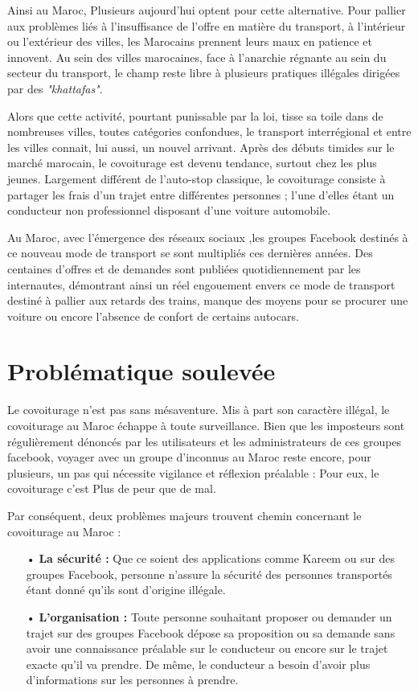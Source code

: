 \documentclass[a4paper]{report}
\begin{document}
\begin{spacing}{2}
Ainsi au Maroc, Plusieurs aujourd'hui optent pour cette alternative. Pour pallier aux problèmes liés à l’insuffisance de l’offre en matière du transport, à l’intérieur ou l’extérieur des villes, les Marocains prennent leurs maux en patience et innovent. Au sein des villes marocaines, face à l’anarchie régnante au sein du secteur du transport, le champ reste libre à plusieurs pratiques illégales dirigées par des \textit{"khattafas"}.

Alors que cette activité, pourtant punissable par la loi, tisse sa toile dans de nombreuses villes, toutes catégories confondues, le transport interrégional et entre les villes connait, lui aussi, un nouvel arrivant. Après des débuts timides sur le marché marocain, le covoiturage est devenu tendance, surtout chez les plus jeunes. Largement différent de l'auto-stop classique, le covoiturage consiste à partager les frais d’un trajet entre différentes personnes ; l’une d’elles étant un conducteur non professionnel disposant d’une voiture automobile.

Au Maroc, avec l’émergence des réseaux sociaux ,les groupes Facebook destinés à ce nouveau mode de transport se sont multipliés ces dernières années. Des centaines d’offres et de demandes sont publiées quotidiennement par les internautes, démontrant ainsi un réel engouement envers ce mode de transport destiné à pallier aux retards des trains, manque des moyens pour se procurer une voiture ou encore l’absence de confort de certains autocars.


\section{Problématique soulevée}
\par 
Le covoiturage n’est pas sans mésaventure. Mis à part son caractère illégal, le covoiturage au Maroc échappe à toute surveillance. Bien que les imposteurs sont régulièrement dénoncés par les utilisateurs et les administrateurs de ces groupes facebook, voyager avec un groupe d’inconnus au Maroc reste encore, pour plusieurs, un pas qui nécessite vigilance et réflexion préalable : Pour eux, le covoiturage c'est \textsf{Plus de peur que de mal}.

\par 
Par conséquent, deux problèmes majeurs trouvent chemin concernant le covoiturage au Maroc :
\begin{itemize}
\item[•] \textbf{La sécurité :} Que ce soient des applications comme Kareem ou sur des groupes Facebook, personne n'assure la sécurité des personnes transportés étant donné qu'ils sont d'origine illégale. 
\item[•] \textbf{L'organisation :} Toute personne souhaitant proposer ou demander un trajet sur des groupes Facebook dépose sa proposition ou sa demande sans avoir une connaissance préalable sur le conducteur ou encore sur le trajet exacte qu'il va prendre. De même, le conducteur a besoin d'avoir plus d'informations sur les personnes à prendre.                 
\end{itemize}
\cleardoublepage

\end{spacing}
\end{document}
